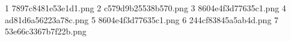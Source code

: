 1 7897c8481e53e1d1.png
2 c579d9b25538b570.png
3 8604e4f3d77635c1.png
4 ad81d6a56223a78c.png
5 8604e4f3d77635c1.png
6 244cf83845a5ab4d.png
7 53e66c3367b7f22b.png
